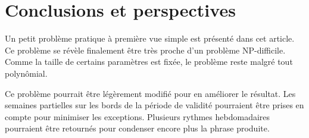 \documentclass{roadef}
\begin{document}
\section{Conclusions et perspectives}

Un petit problème pratique à première vue simple est présenté dans cet
article. Ce problème se révèle finalement être très proche d'un
problème NP-difficile. Comme la taille de certains paramètres est
fixée, le problème reste malgré tout polynômial.

Ce problème pourrait être légèrement modifié pour en améliorer le
résultat. Les semaines partielles sur les bords de la période de
validité pourraient être prises en compte pour minimiser les
exceptions. Plusieurs rythmes hebdomadaires pourraient être retournés
pour condenser encore plus la phrase produite.



\end{document}
